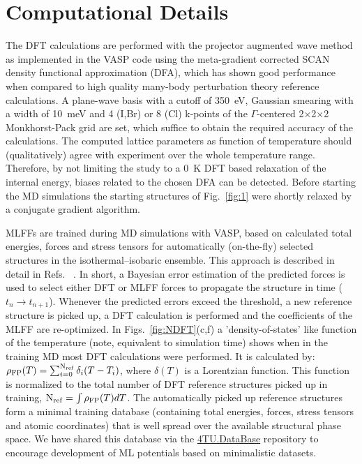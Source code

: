 \documentclass[journal=jpccck,manuscript=article,layout=twocolumn]{achemso}
\begin{document}
\section{Computational Details}

The DFT calculations are performed with the projector augmented wave method\cite{Blochl:prb94b} as implemented in the VASP code\cite{Kresse:prb96,Kresse:cms96} using the meta-gradient corrected SCAN\cite{Sun:prl15} density functional approximation (DFA), which has shown good performance when compared to high quality many-body perturbation theory reference calculations\cite{Bokdam:prl17}. A plane-wave basis with a cutoff of 350~eV, Gaussian smearing with a width of 10~meV and 4 (I,Br) or 8 (Cl) k-points of the $\Gamma$-centered 2$\times$2$\times$2 Monkhorst-Pack grid are set, which suffice to obtain the required accuracy of the calculations\cite{Lahnsteiner:prm18}. The computed lattice parameters as function of temperature should (qualitatively) agree with experiment over the whole temperature range. Therefore, by not limiting the study to a 0~K DFT based relaxation of the internal energy, biases related to the chosen DFA can be detected\cite{Bokdam:prl17}. Before starting the MD simulations the starting structures of Fig.~\ref{fig:1} were shortly relaxed by a conjugate gradient algorithm. \newline


MLFFs are trained during MD simulations with VASP, based on calculated total energies, forces and stress tensors for automatically (on-the-fly) selected structures in the isothermal–isobaric ensemble. This approach is described in
detail in Refs. ~\cite{Jinnouchi:prl19,Jinnouchi:prb19}. In short, a Bayesian error estimation of the predicted forces is used to select either DFT or MLFF forces to propagate the structure in time ($t_n\rightarrow t_{n+1}$). Whenever the predicted errors exceed the threshold, a new reference structure is picked up, a DFT calculation is performed and the coefficients of the MLFF are re-optimized. In Figs.~\ref{fig:NDFT}(c,f) a 'density-of-states' like function of the temperature (note, equivalent to simulation time) shows when in the training MD most DFT calculations were performed. It is calculated by: $\rho_{\rm FP}(T)=\sum_{i=0}^{\rm N_{ref}}\delta_i(T-T_i)$, where $\delta(T)$ is a Lorentzian function. This function is normalized to the total number of DFT reference structures picked up in training, ${\rm N_{ref}}=\int \rho_{\rm FP}(T)dT$. The automatically picked up reference structures form a minimal training database (containing total energies, forces, stress tensors and atomic coordinates) that is well spread over the available structural phase space. We have shared this database via the \href{https://doi.org/10.4121/14710323.v1}{4TU.DataBase} repository\cite{Bokdam:4TUDATA21} to encourage development of ML potentials based on minimalistic datasets.
\end{document}
